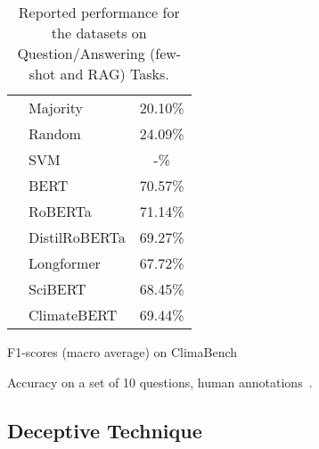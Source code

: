 \begin{table*}[ht]
\begin{subtable}[t]{0.45\textwidth}
{\begin{tabular}{llc}
            \midrule
            \citet{spokoyny2023answering} & Majority & 20.10\% \\
            \citet{spokoyny2023answering} & Random & 24.09\% \\
            \citet{spokoyny2023answering} & SVM & -\% \\
            \citet{spokoyny2023answering} & BERT & 70.57\% \\
            \citet{spokoyny2023answering} & RoBERTa & 71.14\% \\
            \citet{spokoyny2023answering} & DistilRoBERTa & 69.27\% \\
            \citet{spokoyny2023answering} & Longformer & 67.72\% \\
            \citet{spokoyny2023answering} & SciBERT & 68.45\% \\
            \citet{spokoyny2023answering} & ClimateBERT & 69.44\% \\
            \bottomrule        
        \end{tabular}
        }
        \caption{F1-scores (macro average) on ClimaBench~\cite{spokoyny2023answering}}
        \label{tab:appendix climabench}
    \end{subtable}
     \begin{subtable}[t]{0.45\textwidth}
        \vspace{-2.32cm}
        \caption{Accuracy on a set of 10 questions, human annotations~\cite{s_vaghefi_chatclimate_2023}.}
        \label{tab:climateIPCC}
    \end{subtable}
    \caption{Reported performance for the datasets on Question/Answering (few-shot and RAG) Tasks.}
     \label{tab:climate QA}
\end{table*}

\newpage

\subsection{Deceptive Technique}

